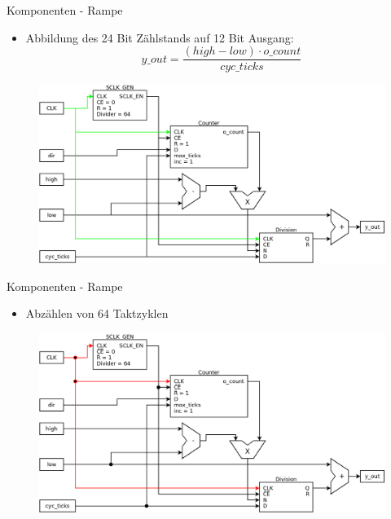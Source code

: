 \documentclass[11pt]{beamer}
\begin{document}
\begin{frame}{Komponenten - Rampe}
  \begin{itemize}
  \item Abbildung des 24 Bit Zählstands auf 12 Bit Ausgang:
    $$ y\_out = \frac{(high - low) \cdot o\_count}{cyc\_ticks} $$
  \end{itemize}
  \begin{figure}
    \includegraphics[scale=0.28]{ramp}
  \end{figure}
\end{frame}

\begin{frame}{Komponenten - Rampe}
  \begin{itemize}
  \item  Abzählen von 64 Taktzyklen
  \end{itemize}
  \begin{figure}
    \includegraphics[scale=0.28]{ramp_step0}
  \end{figure}
\end{frame}
\end{document}
